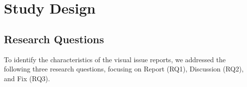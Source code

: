 \section{Study Design}
\label{sec:design}


\subsection{Research Questions}
\label{sec:rqs}

To identify the characteristics of the visual issue reports, we addressed the following three research questions, focusing on Report (RQ1), Discussion (RQ2), and Fix (RQ3). 
